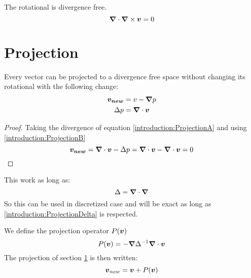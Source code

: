 \begin{property}
The rotational is divergence free.
 \begin{equation}
  {\boldsymbol {\nabla}}\cdot {\boldsymbol {\nabla}} \times {\boldsymbol {v}}=0
 \end{equation}
\end{property}

\section{Projection}
\label{introduction:projection}
\begin{property}
 Every vector can be projected to a divergence free space without changing its rotational with the following change:
\begin{align}
 {\boldsymbol {v_{new}}}&=v-{\boldsymbol {\nabla}}p \label{introduction:ProjectionA}\\
 \Delta p&={\boldsymbol {\nabla}} \cdot {\boldsymbol {v}} \label{introduction:ProjectionB}
\end{align}
\end{property}
\begin{proof}
  Taking the divergence of equation \ref{introduction:ProjectionA} and using \ref{introduction:ProjectionB}
  \begin{equation}
   {\boldsymbol {v_{new}}}={\boldsymbol {\nabla}}\cdot{\boldsymbol {v}}-\Delta p={\boldsymbol {\nabla}}\cdot{\boldsymbol {v}}-{\boldsymbol {\nabla}}\cdot{\boldsymbol {v}}=0
  \end{equation}
  \end{proof}
  
  \begin{remark}
 This work as long as:
 \begin{equation}
  \Delta={\boldsymbol {\nabla}}\cdot {\boldsymbol {\nabla}}\label{introduction:ProjectionDelta}
 \end{equation}
 So this can be used in discretized case and will be exact as long as \ref{introduction:ProjectionDelta} is respected.
 \end{remark}


\begin{definition}
\label{introduction:projectiondef}
We define the projection operator $P({\boldsymbol {v}})$
  \begin{equation}
    P({\boldsymbol {v}})=-{\boldsymbol {\nabla}}\Delta^{-1}{\boldsymbol {\nabla}}\cdot {\boldsymbol {v}}
  \end{equation}
  The projection of section \ref{introduction:projection} is then written:
  \begin{equation}
    {\boldsymbol {v}}_{new}={\boldsymbol {v}}+P({\boldsymbol {v}})
  \end{equation}
\end{definition}

